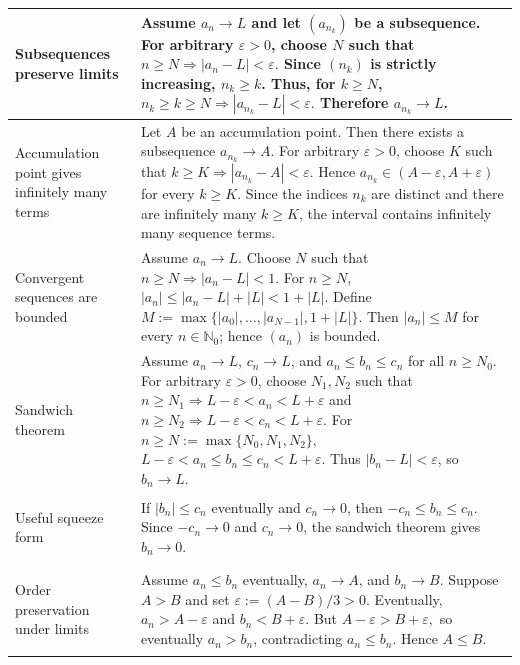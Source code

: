 {\begin{minipage}[t]{0.495\textwidth}
\begin{tabular}{
    @{}
    >{\bfseries\raggedright\arraybackslash}p{3.0cm}
    >{\raggedright\arraybackslash}p{10.4cm}
    @{}
}
\midrule

Subsequences preserve limits &
Assume $a_n\to L$ and let $(a_{n_k})$ be a subsequence. For arbitrary
$\varepsilon>0$, choose $N$ such that
$
n\ge N\Rightarrow |a_n-L|<\varepsilon.
$
Since $(n_k)$ is strictly increasing, $n_k\ge k$. Thus, for $k\ge N$,
$
n_k\ge k\ge N
\Rightarrow
|a_{n_k}-L|<\varepsilon.
$
Therefore $a_{n_k}\to L$.
\\

\midrule

Accumulation point gives infinitely many terms &
Let $A$ be an accumulation point. Then there exists a subsequence
$a_{n_k}\to A$. For arbitrary $\varepsilon>0$, choose $K$ such that
$
k\ge K\Rightarrow |a_{n_k}-A|<\varepsilon.
$
Hence
$
a_{n_k}\in(A-\varepsilon,A+\varepsilon)
$
for every $k\ge K$. Since the indices $n_k$ are distinct and there are
infinitely many $k\ge K$, the interval contains infinitely many sequence
terms.
\\

\midrule

Convergent sequences are bounded &
Assume $a_n\to L$. Choose $N$ such that
$
n\ge N\Rightarrow |a_n-L|<1.
$
For $n\ge N$,
$
|a_n|
\le |a_n-L|+|L|
<1+|L|.
$
Define
$
M:=\max\{|a_0|,\ldots,|a_{N-1}|,1+|L|\}.
$
Then $|a_n|\le M$ for every $n\in\mathbb N_0$; hence $(a_n)$ is bounded.
\\

\midrule

Sandwich theorem &
Assume $a_n\to L$, $c_n\to L$, and
$a_n\le b_n\le c_n$ for all $n\ge N_0$.
For arbitrary $\varepsilon>0$, choose $N_1,N_2$ such that
$
n\ge N_1\Rightarrow L-\varepsilon<a_n<L+\varepsilon
$
and
$
n\ge N_2\Rightarrow L-\varepsilon<c_n<L+\varepsilon.
$
For
$
n\ge N:=\max\{N_0,N_1,N_2\},
$
$
L-\varepsilon<a_n\le b_n\le c_n<L+\varepsilon.
$
Thus $|b_n-L|<\varepsilon$, so $b_n\to L$.
\\

\midrule

Useful squeeze form &
If $|b_n|\le c_n$ eventually and $c_n\to0$, then
$
-c_n\le b_n\le c_n.
$
Since $-c_n\to0$ and $c_n\to0$, the sandwich theorem gives $b_n\to0$.
\\

\midrule

Order preservation under limits &
Assume $a_n\le b_n$ eventually, $a_n\to A$, and $b_n\to B$.
Suppose $A>B$ and set $\varepsilon:=(A-B)/3>0$.
Eventually,
$
a_n>A-\varepsilon
$
and
$
b_n<B+\varepsilon.
$
But
$
A-\varepsilon>B+\varepsilon,
$
so eventually $a_n>b_n$, contradicting $a_n\le b_n$. Hence $A\le B$.
\\


\end{tabular}
\end{minipage}}
